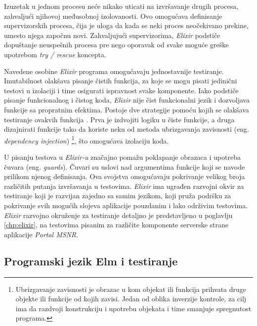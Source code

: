 \documentclass[12pt,oneside]{memoir}
\begin{document}
\par Izuzetak u jednom procesu neće nikako uticati na izvršavanje drugih procesa, zahvaljući njihovoj međusobnoj izolovanosti. Ovo omogućava definisanje supervizorskih procesa, čija je uloga da kada se neki proces neočekivano prekine, umesto njega započnu novi. Zahvaljujući supervizorima, \emph{Elixir} podstiče dopuštanje neuspešnih procesa pre nego oporavak od svake moguće greške upotrebom \emph{try / rescue} koncepta.
\par Navedene osobine \emph{Elixir} programa omogućavaju jednostavnije testiranje. Imutabilnost olakšava pisanje čistih funkcija, za koje se mogu pisati jedinični testovi u izolaciji i time osigurati ispravnost svake komponente. Iako podstiče pisanje funkcionalnog i čistog koda, \emph{Elixir} nije čist funkcionalni jezik i dozvoljava funkcije sa propratnim efektima.  Postoje dve strategije pomoću kojih se olakšava testiranje ovakvih funkcija \cite{testingelixir}. Prva je izdvojiti logiku u čiste funkcije, a druga dizajnirati funkcije tako da koriste neku od metoda ubrizgavanja zavisnosti (eng. \textit{dependency injection}) \footnote{Ubrizgavanje zavisnosti je obrazac u kom objekat ili funkcija prihvata druge objekte ili funkcije od kojih zavisi. Jedan od oblika inverzije kontrole, za cilj ima da razdvoji konstrukciju i upotrebu objekata i time smanjuje spregnutost programa.}, što omogućava izolaciju koda.  
\par U pisanju testova u \emph{Elixir-u} značajno pomažu poklapanje obrazaca i upotreba čuvara (eng. \emph{guards}). Čuvari su uslovi nad argumentima funkcije koji se navode prilikom njenog definisanja. Ova svojstva omogućavaju pokrivanje velikog broja različitih putanja izvršavanja u testovima. \emph{Elixir} ima ugrađen razvojni okvir za testiranje koji je razvijan zajedno sa samim jezikom, koji pruža podršku za pokrivanje svih mogućih slojeva aplikacije pouzdanim i lako održivim testovima. \emph{Elixir} razvojno okruženje za testiranje detaljno je predstavljeno u poglavlju \ref{chp:elixir}, na testovima pisanim za različite komponente serverske strane aplikacije \emph{Portal MSNR}. 
 
 
 
\subsection{Programski jezik Elm i testiranje}
\end{document}
